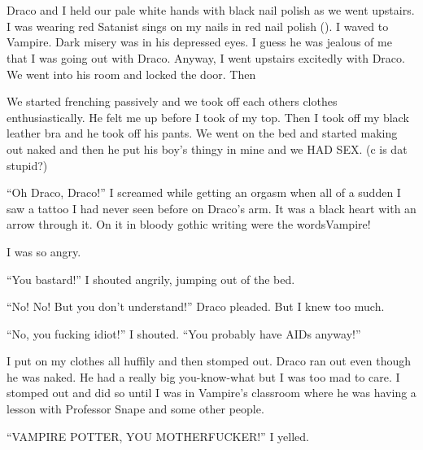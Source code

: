 \section[Bring me 2 life]{\protect{}}



Draco and I held our pale white hands with black nail polish as we went upstairs. I was wearing red Satanist sings on my nails in red nail polish (). I waved to Vampire. Dark misery was in his depressed eyes. I guess he was jealous of me that I was going out with Draco. Anyway, I went upstairs excitedly with Draco. We went into his room and locked the door. Then\dotfill

\begin{sloppypar}
    We started frenching passively and we took off each others clothes enthusiastically. He felt me up before I took of my top. Then I took off my black leather bra and he took off his pants. We went on the bed and started making out naked and then he put his boy's thingy in mine and we HAD SEX\@. (c is dat stupid?)
\end{sloppypar}

\enquote{Oh Draco, Draco!} I screamed while getting an orgasm when all of a sudden I saw a tattoo I had never seen before on Draco's arm. It was a black heart with an arrow through it. On it in bloody gothic writing were the words\dotfill Vampire!

I was so angry.

\enquote{You bastard!} I shouted angrily, jumping out of the bed.

\enquote{No! No! But you don't understand!} Draco pleaded. But I knew too much.

\enquote{No, you fucking idiot!} I shouted. \enquote{You probably have AIDs anyway!}

I put on my clothes all huffily and then stomped out. Draco ran out even though he was naked. He had a really big you-know-what but I was too mad to care. I stomped out and did so until I was in Vampire's classroom where he was having a lesson with Professor Snape and some other people.

\enquote{VAMPIRE POTTER, YOU MOTHERFUCKER!} I yelled.
